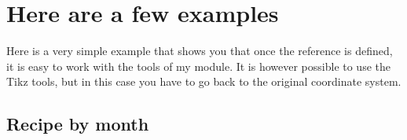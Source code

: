 \section{Here are a few examples}

Here is a very simple example that shows you that once the reference is defined, it is easy to work with the tools of my module. It is however possible to use the Tikz tools, but in this case you have to go back to the original coordinate system.

\subsection{Recipe by month}

\begin{tkzexample}
\end{tkzexample}

\endinput
